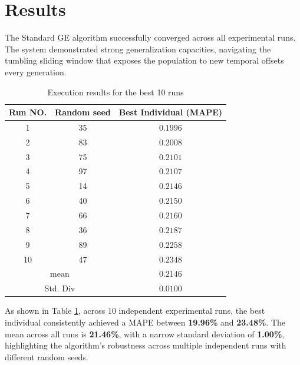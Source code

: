 \documentclass[12pt]{article}
\begin{document}
\section{Results}
    The Standard GE algorithm successfully converged across all experimental runs. The system demonstrated strong generalization capacities, navigating the tumbling sliding window that exposes the population to new temporal offsets every generation.
    
    \begin{table}[h]
        \centering
        \begin{tabular}{|c|c|c|}
            \hline
            \textbf{Run NO.} & \textbf{Random seed} & \textbf{Best Individual (MAPE)}  \\
            \hline
             1 & 35 & $0.1996$ \\
            \hline
             2 & 83 & $0.2008$ \\
            \hline
             3 & 75 & $0.2101$ \\
            \hline
             4 & 97 & $0.2107$ \\
            \hline
             5 & 14 & $0.2146$ \\
            \hline
             6 & 40 & $0.2150$ \\
            \hline
             7 & 66 & $0.2160$ \\
            \hline
             8 & 36 & $0.2187$ \\
            \hline
             9 & 89 & $0.2258$ \\
            \hline
             10 & 47 & $0.2348$ \\
             \hline
             \multicolumn{2}{|c|}{mean} & $0.2146$ \\
             \hline
             \multicolumn{2}{|c|}{Std. Div} & $0.0100$ \\
             \hline
        \end{tabular}
        \caption{Execution results for the best 10 runs}
        \label{tab:results}
    \end{table}

    As shown in Table \ref{tab:results}, across 10 independent experimental runs, the best individual consistently achieved a MAPE between \textbf{19.96\%} and \textbf{23.48\%}. The mean across all runs is \textbf{21.46\%}, with a narrow standard deviation of \textbf{1.00\%}, highlighting the algorithm's robustness across multiple independent runs with different random seeds.
\end{document}

